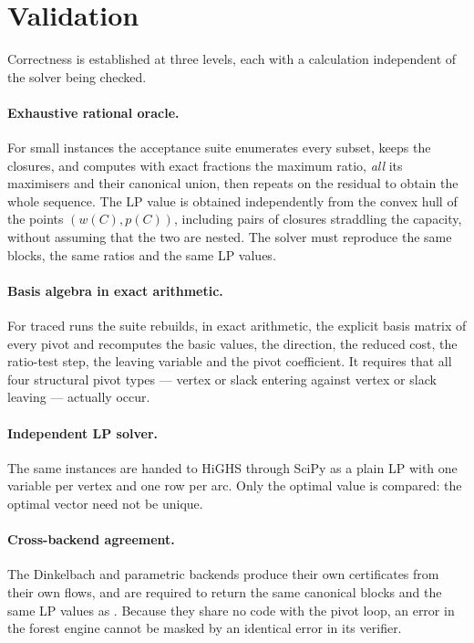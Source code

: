 \section{Validation}
\label{sec:validation}


Correctness is established at three levels, each with a calculation independent
of the solver being checked.

\paragraph{Exhaustive rational oracle.} For small instances the acceptance suite
enumerates every subset, keeps the closures, and computes with exact fractions
the maximum ratio, \emph{all} its maximisers and their canonical union, then
repeats on the residual to obtain the whole sequence. The LP value is obtained
independently from the convex hull of the points $(w(C),p(C))$, including pairs
of closures straddling the capacity, without assuming that the two are nested.
The solver must reproduce the same blocks, the same ratios and the same LP
values.

\paragraph{Basis algebra in exact arithmetic.} For traced runs the suite
rebuilds, in exact arithmetic, the explicit basis matrix of every pivot and
recomputes the basic values, the direction, the reduced cost, the ratio-test
step, the leaving variable and the pivot coefficient. It requires that all four
structural pivot types --- vertex or slack entering against vertex or slack leaving
--- actually occur.

\paragraph{Independent LP solver.} The same instances are handed to HiGHS
through SciPy as a plain LP with one variable per vertex and one row per arc. Only
the optimal value is compared: the optimal vector need not be unique.

\paragraph{Cross-backend agreement.} The Dinkelbach and parametric backends
produce their own certificates from their own flows, and are required to return
the same canonical blocks and the same LP values as \FS{}. Because they share
no code with the pivot loop, an error in the forest engine cannot be masked by an
identical error in its verifier.

